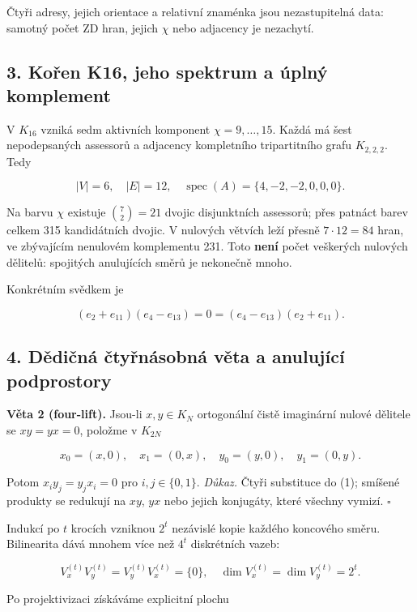 \documentclass[
  10pt,
]{article}
\begin{document}
Čtyři adresy, jejich orientace a relativní znaménka jsou nezastupitelná
data: samotný počet ZD hran, jejich \(\chi\) nebo adjacency je
nezachytí.

\subsection{3. Kořen K16, jeho spektrum a úplný
komplement}\label{koux159en-k16-jeho-spektrum-a-uxfaplnuxfd-komplement}

V \(K_{16}\) vzniká sedm aktivních komponent \(\chi=9,\ldots,15\). Každá
má šest nepodepsaných assessorů a adjacency kompletního tripartitního
grafu \(K_{2,2,2}\). Tedy

\[
|V|=6,\quad |E|=12,\quad\operatorname{spec}(A)=\{4,-2,-2,0,0,0\}.
\tag{6}
\]

Na barvu \(\chi\) existuje \(\binom72=21\) dvojic disjunktních
assessorů; přes patnáct barev celkem 315 kandidátních dvojic. V nulových
větvích leží přesně \(7\cdot12=84\) hran, ve zbývajícím nenulovém
komplementu 231. Toto \textbf{není} počet veškerých nulových dělitelů:
spojitých anulujících směrů je nekonečně mnoho.

Konkrétním svědkem je

\[
(e_2+e_{11})(e_4-e_{13})=0=(e_4-e_{13})(e_2+e_{11}).
\tag{7}
\]

\subsection{4. Dědičná čtyřnásobná věta a anulující
podprostory}\label{dux11bdiux10dnuxe1-ux10dtyux159nuxe1sobnuxe1-vux11bta-a-anulujuxedcuxed-podprostory}

\textbf{Věta 2 (four-lift).} Jsou-li \(x,y\in K_N\) ortogonální čistě
imaginární nulové dělitele se \(xy=yx=0\), položme v \(K_{2N}\)

\[
x_0=(x,0),\quad x_1=(0,x),\quad y_0=(y,0),\quad y_1=(0,y).
\]

Potom \(x_i y_j=y_j x_i=0\) pro \(i,j\in\{0,1\}\). \emph{Důkaz.} Čtyři
substituce do (1); smíšené produkty se redukují na \(xy\), \(yx\) nebo
jejich konjugáty, které všechny vymizí. \(\square\)

Indukcí po \(t\) krocích vzniknou \(2^t\) nezávislé kopie každého
koncového směru. Bilinearita dává mnohem více než \(4^t\) diskrétních
vazeb:

\[
V_x^{(t)}V_y^{(t)}=V_y^{(t)}V_x^{(t)}=\{0\},\quad
\dim V_x^{(t)}=\dim V_y^{(t)}=2^t.
\tag{8}
\]

Po projektivizaci získáváme explicitní plochu
\end{document}
